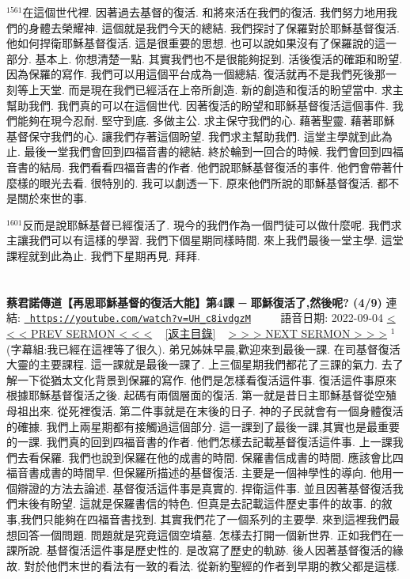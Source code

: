 \documentclass{book}
\begin{document}
$^{1561}$在這個世代裡.
因著過去基督的復活.
和將來活在我們的復活.
我們努力地用我們的身體去榮耀神.
這個就是我們今天的總結.
我們探討了保羅對於耶穌基督復活.
他如何捍衛耶穌基督復活.
這是很重要的思想.
也可以說如果沒有了保羅說的這一部分.
基本上.
你想清楚一點.
其實我們也不是很能夠捉到.
活後復活的確距和盼望.
因為保羅的寫作.
我們可以用這個平台成為一個總結.
復活就再不是我們死後那一刻等上天堂.
而是現在我們已經活在上帝所創造.
新的創造和復活的盼望當中.
求主幫助我們.
我們真的可以在這個世代.
因著復活的盼望和耶穌基督復活這個事件.
我們能夠在現今忍耐.
堅守到底.
多做主公.
求主保守我們的心.
藉著聖靈.
藉著耶穌基督保守我們的心.
讓我們存著這個盼望.
我們求主幫助我們.
這堂主學就到此為止.
最後一堂我們會回到四福音書的總結.
終於輪到一回合的時候.
我們會回到四福音書的結局.
我們看看四福音書的作者.
他們說耶穌基督復活的事件.
他們會帶著什麼樣的眼光去看.
很特別的.
我可以劇透一下.
原來他們所說的耶穌基督復活.
都不是關於來世的事.

$^{1601}$反而是說耶穌基督已經復活了.
現今的我們作為一個門徒可以做什麼呢.
我們求主讓我們可以有這樣的學習.
我們下個星期同樣時間.
來上我們最後一堂主學.
這堂課程就到此為止.
我們下星期再見.
拜拜.
\newpage



\section{}
\label{sec:UH_c8ivdgzM}
\textbf{蔡君諾傳道【再思耶穌基督的復活大能】第4課 ─ 耶穌復活了,然後呢? (4/9)}
\newline
\newline
連結: \href{https://youtube.com/watch?v=UH_c8ivdgzM}{\texttt{ https://youtube.com/watch?v=UH\_c8ivdgzM}} ~~~~ 語音日期: 2022-09-04 
\newline
\newline
\hyperref[sec:A3YDD55lCCE]{\small{< < < PREV SERMON < < <}}
~
\hyperref[sec:index]{\small{[返主目錄]}}
~
\hyperref[sec:6Yg3FVlhsxs]{\small{> > > NEXT SERMON > > >}}
\newline
\newline
$^{1}$(字幕組:我已經在這裡等了很久).
弟兄姊妹早晨,歡迎來到最後一課.
在司基督復活大靈的主要課程.
這一課就是最後一課了.
上三個星期我們都花了三課的氣力.
去了解一下從猶太文化背景到保羅的寫作.
他們是怎樣看復活這件事.
復活這件事原來根據耶穌基督復活之後.
起碼有兩個層面的復活.
第一就是昔日主耶穌基督從空殖母祖出來.
從死裡復活.
第二件事就是在末後的日子.
神的子民就會有一個身體復活的確據.
我們上兩星期都有接觸過這個部分.
這一課到了最後一課,其實也是最重要的一課.
我們真的回到四福音書的作者.
他們怎樣去記載基督復活這件事.
上一課我們去看保羅.
我們也說到保羅在他的成書的時間.
保羅書信成書的時間.
應該會比四福音書成書的時間早.
但保羅所描述的基督復活.
主要是一個神學性的導向.
他用一個辯證的方法去論述.
基督復活這件事是真實的.
捍衛這件事.
並且因著基督復活我們末後有盼望.
這就是保羅書信的特色.
但真是去記載這件歷史事件的故事.
的敘事,我們只能夠在四福音書找到.
其實我們花了一個系列的主要學.
來到這裡我們最想回答一個問題.
問題就是究竟這個空墳墓.
怎樣去打開一個新世界.
正如我們在一課所說.
基督復活這件事是歷史性的.
是改寫了歷史的軌跡.
後人因著基督復活的緣故.
對於他們末世的看法有一致的看法.
從新約聖經的作者到早期的教父都是這樣.
\end{document}

